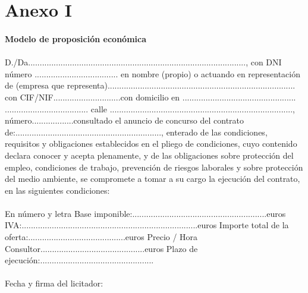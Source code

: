 \section{Anexo I}

	\paragraph{Modelo de proposición económica}

	\paragraph{}D./Da.............................................................................................., con DNI número .................................... en nombre (propio) o actuando en representación de (empresa que representa)................................................................................. con CIF/NIF.............................con domicilio en ................................................. .................................... calle ..............................................................................., número..................consultado el anuncio de concurso del contrato de:\newline ..............................................................., enterado de las condiciones, requisitos y obligaciones establecidos en el pliego de condiciones, cuyo contenido declara conocer y acepta plenamente, y de las obligaciones sobre protección del empleo, condiciones de trabajo, prevención de riesgos laborales y sobre protección del medio ambiente, se compromete a tomar a su cargo la ejecución del contrato, en las siguientes condiciones:
	
	\paragraph{}En número y letra \newline Base imponible:..........................................................euros \newline IVA:............................................................................euros \newline Importe total de la oferta:..........................................euros \newline Precio / Hora Consultor.............................................euros \newline Plazo de ejecución:.................................................
	
	\paragraph{}Fecha y firma del licitador:
	
	\newpage

